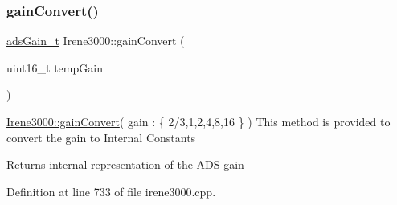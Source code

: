 \subsubsection{\texorpdfstring{gain\+Convert()}{gainConvert()}}
{\footnotesize\ttfamily \hyperlink{_cool_adafruit___a_d_s1015_8h_a3d6c0e15829a207b9155890811fa4781}{ads\+Gain\+\_\+t} Irene3000\+::gain\+Convert (\begin{DoxyParamCaption}\item[{uint16\+\_\+t}]{temp\+Gain }\end{DoxyParamCaption})}

\hyperlink{class_irene3000_abcad62d1201a59f8dd3ba87048002728}{Irene3000\+::gain\+Convert}( gain \+: \{ 2/3,1,2,4,8,16 \} ) This method is provided to convert the gain to Internal Constants

\begin{DoxyReturn}{Returns}
internal representation of the A\+DS gain 
\end{DoxyReturn}


Definition at line 733 of file irene3000.\+cpp.



